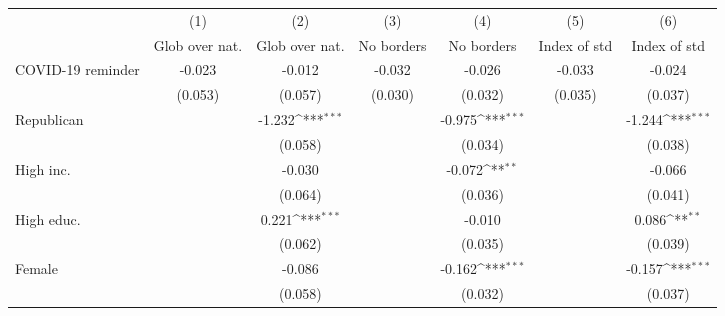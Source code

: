 {
\def\sym#1{\ifmmode^{#1}\else\(^{#1}\)\fi}
\begin{tabular}{l*{6}{c}}
\toprule
                    &\multicolumn{1}{c}{(1)}&\multicolumn{1}{c}{(2)}&\multicolumn{1}{c}{(3)}&\multicolumn{1}{c}{(4)}&\multicolumn{1}{c}{(5)}&\multicolumn{1}{c}{(6)}\\
                    &\multicolumn{1}{c}{Glob over nat.}&\multicolumn{1}{c}{Glob over nat.}&\multicolumn{1}{c}{No borders}&\multicolumn{1}{c}{No borders}&\multicolumn{1}{c}{Index of std}&\multicolumn{1}{c}{Index of std}\\
\midrule
COVID-19 reminder   &      -0.023         &      -0.012         &      -0.032         &      -0.026         &      -0.033         &      -0.024         \\
                    &     (0.053)         &     (0.057)         &     (0.030)         &     (0.032)         &     (0.035)         &     (0.037)         \\
\addlinespace
Republican          &                     &      -1.232\sym{***}&                     &      -0.975\sym{***}&                     &      -1.244\sym{***}\\
                    &                     &     (0.058)         &                     &     (0.034)         &                     &     (0.038)         \\
\addlinespace
High inc.           &                     &      -0.030         &                     &      -0.072\sym{**} &                     &      -0.066         \\
                    &                     &     (0.064)         &                     &     (0.036)         &                     &     (0.041)         \\
\addlinespace
High educ.          &                     &       0.221\sym{***}&                     &      -0.010         &                     &       0.086\sym{**} \\
                    &                     &     (0.062)         &                     &     (0.035)         &                     &     (0.039)         \\
\addlinespace
Female              &                     &      -0.086         &                     &      -0.162\sym{***}&                     &      -0.157\sym{***}\\
                    &                     &     (0.058)         &                     &     (0.032)         &                     &     (0.037)         \\

\end{tabular}}
